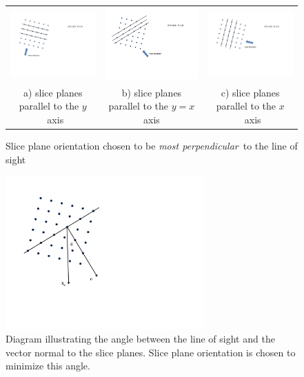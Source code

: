 {\begin{figure}
\begin{tabular}{ccc}
\includegraphics[width=2.25in]{FIGURES/figDIR1a}&
\includegraphics[width=2.25in]{FIGURES/figDIR1b}&
\includegraphics[width=2.25in]{FIGURES/figDIR1c}\\
a) slice planes parallel to the $y$~axis& b) slice planes parallel
to the $y=x$ axis&
c) slice planes parallel to the $x$~axis\\
\end{tabular}
\caption{Slice plane orientation chosen to be {\em most perpendicular}\ to the line of sight }
\label{figDIRA}
\end{figure}

\begin{figure}
\centerline{\includegraphics[width=3.0in]{FIGURES/figDIR2}}
\caption[Diagram illustrating the angle between the line of sight
and the vector normal to the slice planes.]{Diagram illustrating
the angle between the line of sight and the vector normal to the
slice planes.  Slice plane orientation is chosen to minimize this
angle.} \label{figDIRB}
\end{figure}

}
